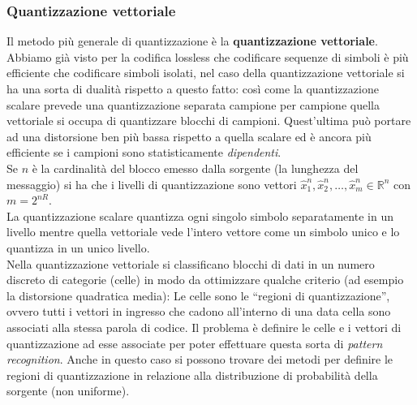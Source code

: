 \subsubsection{Quantizzazione vettoriale}
Il metodo più generale di quantizzazione è la \textbf{quantizzazione vettoriale}. Abbiamo già visto per la codifica lossless che codificare sequenze di simboli è più efficiente che codificare simboli isolati, nel caso della quantizzazione vettoriale si ha una sorta di dualit\`a rispetto a questo fatto: cos\`i come la quantizzazione scalare prevede una quantizzazione separata campione per campione quella vettoriale si occupa di quantizzare blocchi di campioni. Quest'ultima può portare ad una distorsione ben più bassa rispetto a quella scalare ed è ancora più efficiente se i campioni sono statisticamente \textit{dipendenti}.\\
Se $n$ \`e la cardinalit\`a del blocco emesso dalla sorgente (la lunghezza del messaggio) si ha che i livelli di quantizzazione sono vettori $\hat{x}_1^n, \hat{x}_2^n, \dots, \hat{x}_m^n \in \mathbb{R}^n$ con $m = 2^{nR}$. \\
La quantizzazione scalare quantizza ogni singolo simbolo separatamente in un livello mentre quella vettoriale vede l’intero vettore come un simbolo unico e lo quantizza in un unico livello.\\
Nella quantizzazione vettoriale si classificano blocchi di dati in un numero discreto di categorie (celle) in modo da ottimizzare qualche criterio (ad esempio la distorsione quadratica media): Le celle sono le “regioni di quantizzazione”, ovvero tutti i vettori in ingresso che cadono all’interno di una data cella sono associati alla stessa parola di codice. Il problema è definire le celle e i vettori di quantizzazione ad esse associate per poter effettuare questa sorta di \textit{pattern recognition}. Anche in questo caso si possono trovare dei metodi per definire le regioni di quantizzazione in relazione alla distribuzione di probabilità della sorgente (non uniforme).

